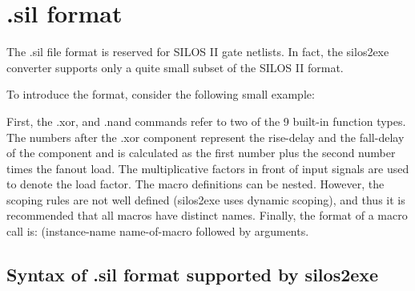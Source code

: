 \section{.sil format}

The .sil file format is reserved for SILOS II gate netlists.
In fact, the silos2exe converter supports only a quite small subset of the
SILOS II format.

To introduce the format, consider the following small example:

First, the .xor, and .nand commands refer to two of the 9 built-in
function types.
The numbers after the .xor component represent the rise-delay
and the fall-delay of the component and is calculated
as the first number plus the second number times the fanout load.
The multiplicative factors in front of input signals are used to
denote the load factor.
The macro definitions can be nested.
However, the scoping rules are not well defined (silos2exe uses dynamic
scoping), and thus it is recommended that all macros have distinct names.
Finally, the format of a macro call is: (instance-name name-of-macro
followed by arguments.

\subsection{Syntax of .sil format supported by silos2exe}

